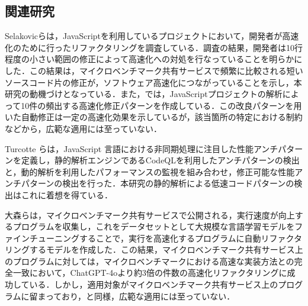 \documentclass[submit,techrep,noauthor]{ipsj}
\newcommand{\memo}[1]{\colorbox{magenta!30}{{\bf MEMO}:}{\color{red!50} {\textbf{[#1]}}}}
\begin{document}


\subsection{関連研究}

Selakovicら\cite{jsRefac}は，JavaScriptを利用しているプロジェクトにおいて，開発者が高速化のために行ったリファクタリングを調査している．調査の結果，開発者は10行程度の小さい範囲の修正によって高速化への対処を行なっていることを明らかにした．この結果は，マイクロベンチマーク共有サービスで頻繁に比較される短いソースコード片の修正が，ソフトウェア高速化につながっていることを示し，本研究の動機づけとなっている．また，\cite{jsRefac}では，JavaScriptプロジェクトの解析によって10件の頻出する高速化修正パターンを作成している．この改良パターンを用いた自動修正は一定の高速化効果を示しているが，該当箇所の特定における制約などから，広範な適用には至っていない．

Turcotte ら\cite{DrAsync}は，JavaScript 言語における非同期処理に注目した性能アンチパターンを定義し，静的解析エンジンであるCodeQL\cite{ql}を利用したアンチパターンの検出と，動的解析を利用したパフォーマンスの監視を組み合わせ，修正可能な性能アンチパターンの検出を行った．本研究の静的解析による低速コードパターンの検出はこれに着想を得ている．

大森ら\cite{omori}は，マイクロベンチマーク共有サービスで公開される，実行速度が向上するプログラムを収集し，これをデータセットとして大規模な言語学習モデルをファインチューニングすることで，実行を高速化するプログラムに自動リファクタリングするモデルを作成した．この結果，マイクロベンチマーク共有サービス上のプログラムに対しては，マイクロベンチマークにおける高速な実装方法との完全一致において，ChatGPT-4oより約3倍の件数の高速化リファクタリングに成功している．しかし，適用対象がマイクロベンチマーク共有サービス上のプログラムに留まっており，\cite{jsRefac}と同様，広範な適用には至っていない．

\end{document}
